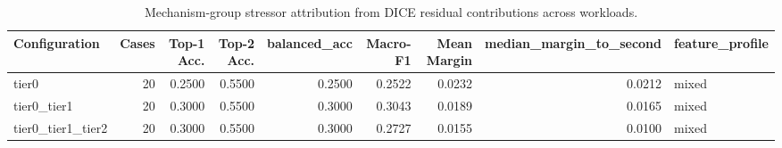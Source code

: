 \begin{table}[t]
\centering
\caption{Mechanism-group stressor attribution from DICE residual contributions across workloads.}
\label{tab:dice_stressor_diagnosis}
\footnotesize
\begin{tabular}{lrrrrrrrl}
\toprule
Configuration & Cases & Top-1 Acc. & Top-2 Acc. & balanced_acc & Macro-F1 & Mean Margin & median_margin_to_second & feature_profile \\
\midrule
tier0 & 20 & 0.2500 & 0.5500 & 0.2500 & 0.2522 & 0.0232 & 0.0212 & mixed \\
tier0_tier1 & 20 & 0.3000 & 0.5500 & 0.3000 & 0.3043 & 0.0189 & 0.0165 & mixed \\
tier0_tier1_tier2 & 20 & 0.3000 & 0.5500 & 0.3000 & 0.2727 & 0.0155 & 0.0100 & mixed \\
\bottomrule
\end{tabular}

\end{table}
